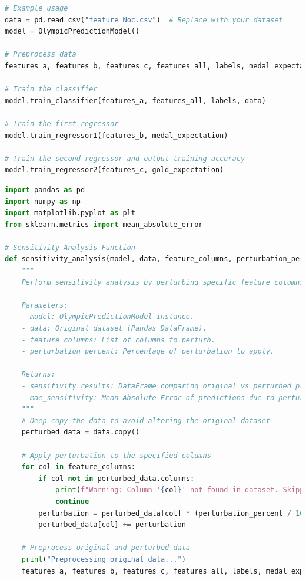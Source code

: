 \documentclass[12pt]{article}
\begin{document}
\begin{lstlisting}[language=Python, style=mystyle, caption=model.ipynb]
# Example usage
data = pd.read_csv("feature_Noc.csv")  # Replace with your dataset
model = OlympicPredictionModel()

# Preprocess data
features_a, features_b, features_c, features_all, labels, medal_expectation, gold_expectation = model.preprocess_data(data)

# Train the classifier
model.train_classifier(features_a, features_all, labels, data)

# Train the first regressor
model.train_regressor1(features_b, medal_expectation)

# Train the second regressor and output training accuracy
model.train_regressor2(features_c, gold_expectation)

\end{lstlisting}

\begin{lstlisting}[language=Python, style=mystyle, caption=robust\_sensitivity.ipynb]
import pandas as pd
import numpy as np
import matplotlib.pyplot as plt
from sklearn.metrics import mean_absolute_error

# Sensitivity Analysis Function
def sensitivity_analysis(model, data, feature_columns, perturbation_percent):
    """
    Perform sensitivity analysis by perturbing specific feature columns and observing prediction changes.

    Parameters:
    - model: OlympicPredictionModel instance.
    - data: Original dataset (Pandas DataFrame).
    - feature_columns: List of columns to perturb.
    - perturbation_percent: Percentage of perturbation to apply.

    Returns:
    - sensitivity_results: DataFrame comparing original vs perturbed predictions.
    - mae_sensitivity: Mean Absolute Error of predictions due to perturbation.
    """
    # Deep copy the data to avoid altering the original dataset
    perturbed_data = data.copy()

    # Apply perturbation to the specified columns
    for col in feature_columns:
        if col not in perturbed_data.columns:
            print(f"Warning: Column '{col}' not found in dataset. Skipping...")
            continue
        perturbation = perturbed_data[col] * (perturbation_percent / 100.0)
        perturbed_data[col] += perturbation

    # Preprocess original and perturbed data
    print("Preprocessing original data...")
    features_a, features_b, features_c, features_all, labels, medal_expectation, gold_expectation = model.preprocess_data(data)


\end{lstlisting}
\end{document}
